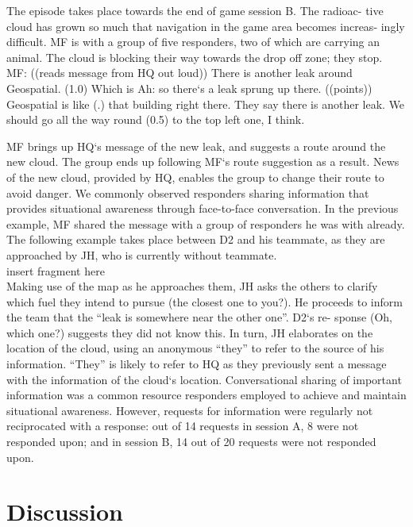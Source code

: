 The episode takes place towards the end of game session B. The radioac- tive cloud has grown so much that navigation in the game area becomes increas- ingly difficult. MF is with a group of five responders, two of which are carrying an animal. The cloud is blocking their way towards the drop off zone; they stop.\\

MF: ((reads message from HQ out loud)) There is another leak around Geospatial. (1.0) Which is Ah: so there`s a leak sprung up there. ((points)) Geospatial is like (.) that building right there. They say there is another leak. We should go all the way round (0.5) to the top left one, I think.

MF brings up HQ`s message of the new leak, and suggests a route around the new cloud. The group ends up following MF`s route suggestion as a result. News of the new cloud, provided by HQ, enables the group to change their route to avoid danger. We commonly observed responders sharing information that provides situational awareness through face-to-face conversation. In the previous example, MF shared the message with a group of responders he was with already. The following example takes place between D2 and his teammate, as they are approached by JH, who is currently without teammate.\\

insert fragment here\\

Making use of the map as he approaches them, JH asks the others to clarify which fuel they intend to pursue (the closest one to you?). He proceeds to inform the team that the ``leak is somewhere near the other one''. D2`s re- sponse (Oh, which one?) suggests they did not know this. In turn, JH elaborates on the location of the cloud, using an anonymous ``they'' to refer to the source of his information. ``They'' is likely to refer to HQ as they previously sent a message with the information of the cloud`s location. Conversational sharing of important information was a common resource responders employed to achieve and maintain situational awareness. However, requests for information were regularly not reciprocated with a response: out of 14 requests in session A, 8 were not responded upon; and in session B, 14 out of 20 requests were not responded upon.\\

\section{Discussion}


